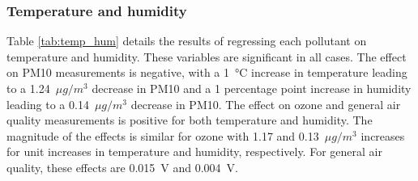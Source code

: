 \documentclass[11pt,twosided,a4paper]{report}
\begin{document}

\subsubsection{Temperature and humidity}

Table \ref{tab:temp_hum} details the results of regressing each pollutant on temperature and humidity. These variables are significant in all cases. The effect on PM10 measurements is negative, with a \SI{1}{\celsius} increase in temperature leading to a 1.24~$\mu g/m^3$ decrease in PM10 and a 1 percentage point increase in humidity leading to a 0.14~$\mu g/m^3$ decrease in PM10. The effect on ozone and general air quality measurements is positive for both temperature and humidity. The magnitude of the effects is similar for ozone with 1.17 and 0.13~$\mu g/m^3$ increases for unit increases in temperature and humidity, respectively. For general air quality, these effects are 0.015~V and 0.004~V.
\end{document}

